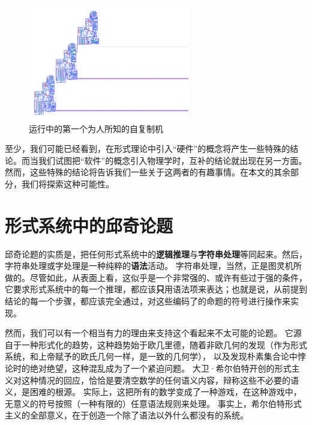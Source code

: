 \documentclass[a4paper,12pt]{article}
\begin{document}
\begin{figure}[ht]
\centering
\includegraphics[height=2.0in]{images/self_reprod.png}
\caption{运行中的第一个为人所知的自复制机}
\end{figure}

至少，我们可能已经看到，在\gls{形式理论}中引入“\gls{硬件}”的概念将产生一些特殊的结论。而当我们试图把“\gls{软件}”的概念引入物理学时，互补的结论就出现在另一方面。
然而，这些特殊的结论将告诉我们一些关于这两者的有趣事情。在本文的其余部分，我们将探索这种可能性。

\section{形式系统中的邱奇论题}

\gls{邱奇论题}的实质是，把任何\gls{形式系统}中的\textbf{\gls{逻辑推理}}与\textbf{\gls{字符串处理}}等同起来。然后，\gls{字符串处理}或字处理是一种纯粹的\textbf{\gls{语法}}活动。
\gls{字符串处理}，当然，正是\gls{图灵机}所做的。尽管如此，从表面上看，这似乎是一个非常强的、或许有些过于强的条件，
它要求\gls{形式系统}中的每一个\gls{推理}，都应该\textbf{只}用\gls{语法项}来表达；也就是说，从前提到结论的每一个步骤，都应该完全通过，对这些\gls{编码}了的\gls{命题}的符号进行操作来实现。

然而，我们可以有一个相当有力的理由来支持这个看起来不太可能的论题。
它源自于一种\gls{形式化}的趋势，这种趋势始于欧几里德，随着非欧几何的发现（作为\gls{形式系统}，和上帝赋予的欧氏几何一样，是一致的几何学），
以及发现朴素集合论中悖论时的绝对绝望，这种混乱成为了一个紧迫问题。
大卫·希尔伯特开创的\gls{形式主义}对这种情况的回应，恰恰是要清空数学的任何\gls{语义内容}，辩称这些不必要的\gls{语义}，是困难的根源。
实际上，这把所有的数学变成了一种游戏，在这种游戏中，无意义的符号按照（一种有限的）任意\gls{语法规则}来处理。
事实上，希尔伯特\gls{形式主义}的全部意义，在于创造一个除了\gls{语法}以外什么都没有的系统。
\end{document}
